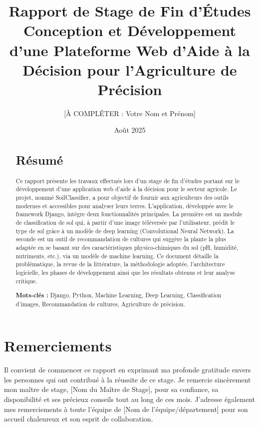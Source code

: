\documentclass[12pt, a4paper]{report}
\title{Rapport de Stage de Fin d'Études \\ \vspace{0.5cm} \large Conception et Développement d'une Plateforme Web d'Aide à la Décision pour l'Agriculture de Précision}
\author{[À COMPLÉTER : Votre Nom et Prénom]}
\date{Août 2025}
\begin{document}
\maketitle
\thispagestyle{empty}

\chapter*{Remerciements}
Il convient de commencer ce rapport en exprimant ma profonde gratitude envers les personnes qui ont contribué à la réussite de ce stage. Je remercie sincèrement mon maître de stage, [Nom du Maître de Stage], pour sa confiance, sa disponibilité et ses précieux conseils tout au long de ces mois. J'adresse également mes remerciements à toute l'équipe de [Nom de l'équipe/département] pour son accueil chaleureux et son esprit de collaboration.

\clearpage
\thispagestyle{empty}

\begin{abstract}
\section*{Résumé}
Ce rapport présente les travaux effectués lors d'un stage de fin d'études portant sur le développement d'une application web d'aide à la décision pour le secteur agricole. Le projet, nommé SoilClassifier, a pour objectif de fournir aux agriculteurs des outils modernes et accessibles pour analyser leurs terres. L'application, développée avec le framework Django, intègre deux fonctionnalités principales. La première est un module de classification de sol qui, à partir d'une image téléversée par l'utilisateur, prédit le type de sol grâce à un modèle de deep learning (Convolutional Neural Network). La seconde est un outil de recommandation de cultures qui suggère la plante la plus adaptée en se basant sur des caractéristiques physico-chimiques du sol (pH, humidité, nutriments, etc.), via un modèle de machine learning. Ce document détaille la problématique, la revue de la littérature, la méthodologie adoptée, l'architecture logicielle, les phases de développement ainsi que les résultats obtenus et leur analyse critique.

\vspace{0.5cm}
\textbf{Mots-clés :} Django, Python, Machine Learning, Deep Learning, Classification d'images, Recommandation de cultures, Agriculture de précision.
\end{abstract}
\end{document}
